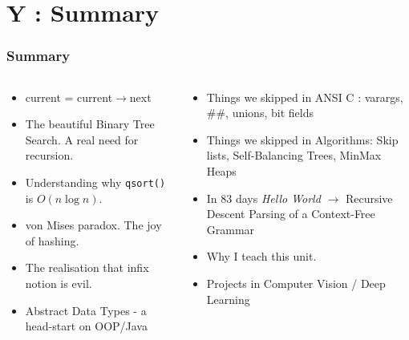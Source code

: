 \section{Y : Summary}
\label{chap:summary}


\begin{frame}[fragile]
\frametitle{Summary}
\begin{columns}[T]

\begin{column}{0.45\textwidth}
\begin{itemize}[<+->]
\item current = current$\rightarrow$next
\item The beautiful Binary Tree Search. A real need for recursion.
\item Understanding why {\tt qsort()} is $O(n \log n)$.
\item von Mises paradox. The joy of hashing.
\item The realisation that infix notion is evil.
\item Abstract Data Types - a head-start on OOP/Java
\end{itemize}
\end{column}

\pause
\begin{column}{0.45\textwidth}
\begin{itemize}[<+->]
\item Things we skipped in ANSI C : varargs, $\#\#$, unions, bit fields
\item Things we skipped in Algorithms: Skip lists, Self-Balancing Trees, MinMax Heaps
\item In 83 days {\it Hello World} $\rightarrow$ Recursive Descent Parsing of a Context-Free Grammar
\item Why I teach this unit.
\item Projects in Computer Vision / Deep Learning
\end{itemize}
\end{column}

\end{columns}
\end{frame}
